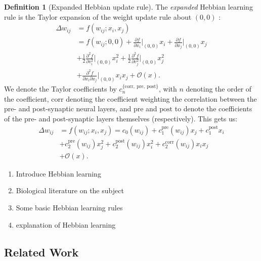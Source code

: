 \documentclass{article}
\theoremstyle{definition}
\newtheorem{definition}{Definition}[subsection]
\begin{document}
\begin{definition}[Expanded Hebbian update rule]
  The \textit{expanded} Hebbian learning rule is the Taylor expansion
  of the weight update rule about $(0, 0)$
  \parencite{gerstner_mathematical_2002}:
  \begin{align*}
    \Delta w_{ij} &= f(w_{ij}; x_i, x_j) \\
    &= f(w_{ij}; 0, 0) + \frac{\partial f}{\partial x_i} \big|_{(0,
    0)} x_i + \frac{\partial f}{\partial x_j}
    \big|_{(0, 0)} x_j \\
    &+ \frac{1}{2} \frac{\partial^2 f}{\partial v^2_i} \big|_{(0, 0)}
    x_i^2 + \frac{1}{2} \frac{\partial^2 f}{\partial v^2_j}\big|_{(0,
    0)} x_j^2 \\
    &+ \frac{\partial^2 f}{\partial x_i \partial x_j}\big|_{(0, 0)}
    x_i x_j + \mathcal{O}(x).
  \end{align*}
  We denote the Taylor coefficients by
  $c_n^{\{\text{corr},~\text{pre},~\text{post}\}}$, with
  $n$ denoting the order of the coefficient, $\text{corr}$ denoting
  the coefficient
  weighting the correlation between the pre- and post-synaptic neural
  layers, and
  $\text{pre}$ and $\text{post}$ to denote the coefficients of the
  pre- and post-synaptic
  layers themselves (respectively).
  This gets us:
  \begin{align*}
    \Delta w_{ij} &= f(w_{ij}; x_i, x_j) =
    c_0 (w_{ij}) + c_1^\text{pre} (w_{ij}) x_j + c_1^\text{post} x_i \\
    &+ c_2^\text{pre} (w_{ij}) x_j^2 + c_2^\text{post} (w_{ij}) x_i^2
    + c_2^\text{corr} (w_{ij}) x_i x_j \\
    &+ \mathcal{O} (x).
  \end{align*}
\end{definition}

\begin{enumerate}
  \item Introduce Hebbian learning
  \item Biological literature on the subject
  \item Some basic Hebbian learning rules
  \item \textcite{gerstner_mathematical_2002} explanation of Hebbian learning
\end{enumerate}

\subsection{Related Work}\label{sec:related-work}
\end{document}
